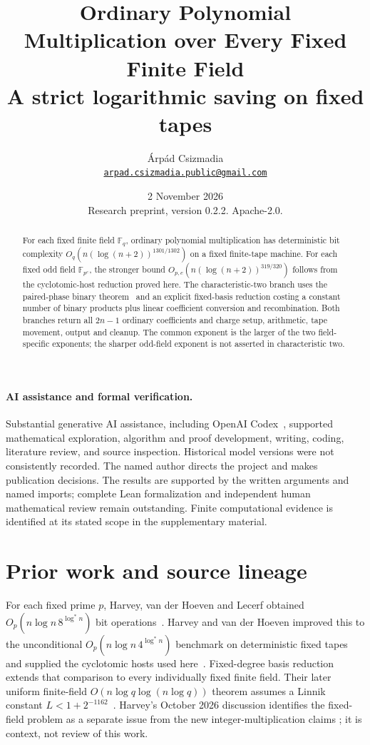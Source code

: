 \documentclass[11pt]{article}
\title{Ordinary Polynomial Multiplication over Every Fixed Finite Field\\
  \large A strict logarithmic saving on fixed tapes}
\author{\'Arp\'ad Csizmadia\\
  \small\href{mailto:arpad.csizmadia.public@gmail.com}{\texttt{arpad.csizmadia.public@gmail.com}}}
\date{2 November 2026\\ \small Research preprint, version 0.2.2. Apache-2.0.}
\theoremstyle{definition}
\newcommand{\F}{\mathbb F}
\begin{document}
\maketitle

\begin{abstract}
For each fixed finite field $\F_q$, ordinary polynomial multiplication
has deterministic bit complexity $O_q(n(\log(n+2))^{1301/1302})$ on
a fixed finite-tape machine. For each fixed odd field $\F_{p^e}$, the
stronger bound $O_{p,e}(n(\log(n+2))^{319/320})$ follows from the
cyclotomic-host reduction proved here. The characteristic-two branch
uses the paired-phase binary theorem~\cite{PairedPhase} and an explicit
fixed-basis reduction costing a constant number of binary products
plus linear coefficient conversion and recombination. Both branches
return all $2n-1$ ordinary coefficients and charge setup, arithmetic,
tape movement, output and cleanup. The common exponent is the larger
of the two field-specific exponents; the sharper odd-field exponent
is not asserted in characteristic two.
\end{abstract}
\paragraph{AI assistance and formal verification.}
Substantial generative AI assistance, including OpenAI Codex~\cite{CodexTool26}, supported
mathematical exploration, algorithm and proof development, writing,
coding, literature review, and source inspection. Historical model
versions were not consistently recorded. The named author directs the
project and makes publication decisions. The results are supported by
the written arguments and named imports; complete Lean formalization
and independent human mathematical review remain outstanding.
Finite computational evidence is identified at its stated scope in
the supplementary material.

\section{Prior work and source lineage}
For each fixed prime $p$, Harvey, van der Hoeven and Lecerf obtained
$O_p(n\log n\,8^{\log^*n})$ bit operations~\cite{HVHL17}.
Harvey and van der Hoeven improved this to the unconditional
$O_p(n\log n\,4^{\log^*n})$ benchmark on deterministic fixed tapes
and supplied the cyclotomic hosts used here~\cite{HVH19Cyclo}.
Fixed-degree basis reduction extends that comparison to every
individually fixed finite field. Their later uniform finite-field
$O(n\log q\log(n\log q))$ theorem assumes a Linnik constant
$L<1+2^{-1162}$~\cite[Theorem 1.2]{HVH22Finite}.
Harvey's October 2026 discussion identifies the fixed-field problem
as a separate issue from the new integer-multiplication claims
\cite[Section 4]{Harvey26Context}; it is context, not review of this work.
\end{document}
